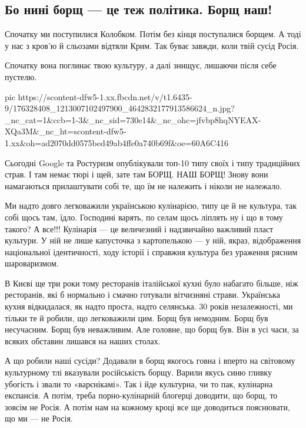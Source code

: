  
 
 
 
 
\subsection{Бо нині борщ — це теж політика. Борщ наш!}

Спочатку ми поступилися Колобком. Потім без кінця поступалися борщем. А тоді у
нас з кров'ю й сльозами відтяли Крим. Так буває завжди, коли твій сусід Росія.

Спочатку вона поглинає твою культуру, а далі знищує, лишаючи після себе
пустелю.

\ifcmt
  pic https://scontent-dfw5-1.xx.fbcdn.net/v/t1.6435-9/176328408_1213007102497900_4642832177913586624_n.jpg?_nc_cat=1&ccb=1-3&_nc_sid=730e14&_nc_ohc=jfvbp8hqNYEAX-XQa3M&_nc_ht=scontent-dfw5-1.xx&oh=ad2070dd0575bed49ab4ffe0a740b69f&oe=60A6C416
\fi


Сьогодні Google та Ростуризм опублікували топ-10 типу своїх і типу традиційних
страв. І там немає тюрі і щей, зате там БОРЩ. НАШ БОРЩ! Знову вони намагаються
прилаштувати собі те, що їм не належить і ніколи не належало.

Ми надто довго легковажили українською кулінарією, типу це й не культура, так
собі щось там, їдло. Господині варять, по селам щось ліплять ну і що в тому
такого? А все!!! Кулінарія — це величезний і надзвичайно важливий пласт
культури. У ній не лише капусточка з картопелькою — у ній, якраз, відображення
національної ідентичності, ходу історії і справжня культура без ураження рясним
шароваризмом. 

В Києві ще три роки тому ресторанів італійської кухні було набагато більше, ніж
ресторанів, які б нормально і смачно готували вітчизняні страви. Українська
кухня відкидалася, як надто проста, надто селянська. 30 років незалежності, ми
тільки те й робили, що легковажили цим. Борщ був немодним. Борщ був несучасним.
Борщ був неважливим. Але головне, що борщ був. Він в усі часи, за всяких
обставин лишався на наших столах. 

А що робили наші сусіди? Додавали в борщ якогось говна і вперто на світовому
культурному тлі вказували російськість борщу. Варили якусь синю гливку убогість
і звали то «варєнікамі». Так і йде культурна, чи то пак, кулінарна експансія. А
потім, треба порно-кулінарній блогерці доводити, що борщ, то зовсім не Росія. А
потім нам на кожному кроці все ще доводиться пояснювати, що ми — не Росія.

